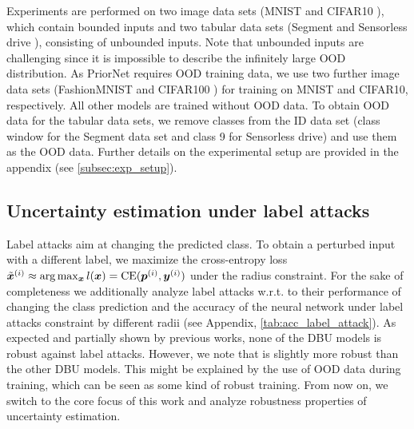 Experiments are performed on two image data sets (MNIST \citep{mnist} and CIFAR10 \citep{cifar10}), which contain bounded inputs and two tabular data sets (Segment \citep{uci_datasets} and Sensorless drive \citep{uci_datasets}), consisting of unbounded inputs. Note that unbounded inputs are challenging since it is impossible to describe the infinitely large OOD distribution. As PriorNet requires OOD training data, we use two further image data sets (FashionMNIST \citep{fashionmnist} and CIFAR100 \citep{cifar10}) for training on MNIST and CIFAR10, respectively. All other models are trained without OOD data. To obtain OOD data for the tabular data sets, we remove classes from the ID data set (class window for the Segment data set and class 9 for Sensorless drive) and use them as the OOD data. Further details on the experimental setup are provided in the appendix (see \cref{subsec:exp_setup}).



 


\subsection{Uncertainty estimation under label attacks}
\label{subsec:label_attacks}
%
Label attacks aim at changing the predicted class. To obtain a perturbed input with a different label, we maximize the cross-entropy loss $\tilde{{\bm{x}}}^{(i)} \approx \arg\max_{{\bm{x}}} l({\bm{x}}) = \text{CE}({\bm{p}}^{(i)}, {\bm{y}}^{(i)})$ under the radius constraint. For the sake of completeness we additionally analyze label attacks w.r.t. to their performance of changing the class prediction and the accuracy of the neural network under label attacks constraint by different radii (see Appendix, \cref{tab:acc_label_attack}). As expected and partially shown by previous works, none of the DBU models is robust against label attacks. %
However, we note that \PriorNet is slightly more robust than the other DBU models. This might be explained by the use of OOD data during training, which can be seen as some kind of robust training. 
%
From now on, we switch to the core focus of this work and analyze robustness properties of uncertainty estimation. 




